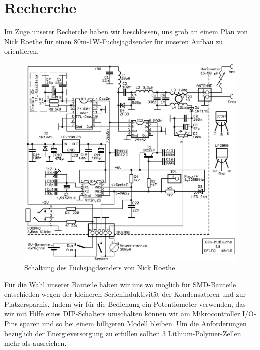 \section{Recherche}

Im Zuge unserer Recherche haben wir beschlossen, uns grob an einem Plan von Nick Roethe für einen \glqq{}80m-1W-Fuchsjagdsender\grqq{} für unseren Aufbau zu orientieren.\\
\begin{figure}[H]
	\centering
	\includegraphics[width=16cm]{res/Recherche_Aufbau.png}
	\caption{Schaltung des Fuchsjagdsenders von Nick Roethe}
\end{figure}

Für die Wahl unserer Bauteile haben wir uns wo möglich für SMD-Bauteile entschieden wegen der kleineren Serieninduktivität der Kondensatoren und zur Platzersparnis.
Indem wir für die Bedienung ein Potentiometer verwenden, das wir mit Hilfe eines DIP-Schalters umschalten können wir am Mikrocontroller I/O-Pins sparen und so bei einem billigeren Modell bleiben. 
Um die Anforderungen bezüglich der Energieversorgung zu erfüllen sollten 3 Lithium-Polymer-Zellen mehr als ausreichen.

